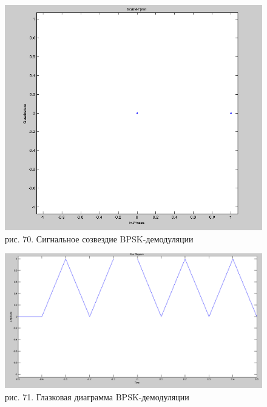 \documentclass[10pt,a4paper]{report}
\begin{document}
\begin{figure}
\begin{center}
\includegraphics[width=150mm, scale = 0.9]{9_3}\newline
рис. 70. Сигнальное созвездие BPSK-демодуляции\newline
\end{center}
\end{figure}
\begin{figure}
\begin{center}
\includegraphics[width=150mm, scale = 0.9]{9_4}\newline
рис. 71. Глазковая диаграмма BPSK-демодуляции\newline
\end{center}
\end{figure}
\end{document}
